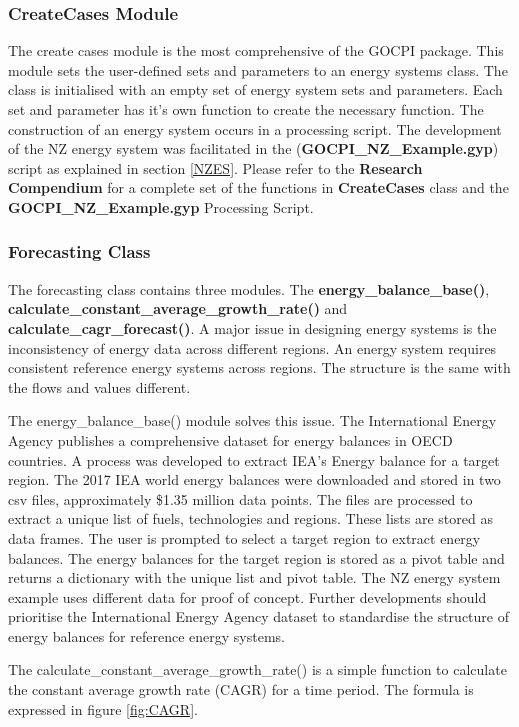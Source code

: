 \documentclass[12pt]{article}
\begin{document}
\subsubsection{CreateCases Module}
The create cases module is the most comprehensive of the GOCPI package.
This module sets the user-defined sets and parameters to an energy systems class.
The class is initialised with an empty set of energy system sets and parameters. 
Each set and parameter has it's own function to create the necessary function.
The construction of an energy system occurs in a processing script.
The development of the NZ energy system was facilitated in the (\textbf{GOCPI\_NZ\_Example.gyp}) script as explained in section \ref{NZES}.
Please refer to the \textbf{Research Compendium} for a complete set of the functions in \textbf{CreateCases} class and the \textbf{GOCPI\_NZ\_Example.gyp} Processing Script.

\subsubsection{Forecasting Class}
The forecasting class contains three modules. The \textbf{energy\_balance\_base()}, \textbf{calculate\_constant\_average\_growth\_rate()} and \textbf{calculate\_cagr\_forecast()}.
A major issue in designing energy systems is the inconsistency of energy data across different regions.
An energy system requires consistent reference energy systems across regions. The structure is the same with the flows and values different.

The energy\_balance\_base() module solves this issue.
The International Energy Agency publishes a comprehensive dataset for energy balances in OECD countries. 
A process was developed to extract IEA's Energy balance for a target region.
The 2017 IEA world energy balances were downloaded and stored in two csv files, approximately \$1.35 million data points.
The files are processed to extract a unique list of fuels, technologies and regions.
These lists are stored as data frames. The user is prompted to select a target region to extract energy balances.
The energy balances for the target region is stored as a pivot table and returns a dictionary with the unique list and pivot table.
The NZ energy system example uses different data for proof of concept. 
Further developments should prioritise the International Energy Agency dataset to standardise the structure of energy balances for reference energy systems.

The calculate\_constant\_average\_growth\_rate() is a simple function to calculate the constant average growth rate (CAGR) for a time period.
The formula is expressed in figure \ref{fig:CAGR}.
\end{document}
